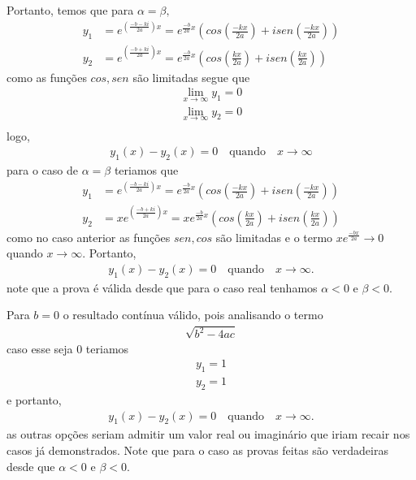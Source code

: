 \documentclass[a4paper,12pt]{article}
\begin{document}
Portanto, temos que para $\alpha = \beta,$
\begin{align*}
	y_1 &= e^{(\frac{-b - ki}{2a})x} =  {e^{\frac{-b}{2a}x}}(cos(\frac{-kx}{2a}) + isen(\frac{-kx}{2a})) \\
	y_2 &= e^{(\frac{-b + ki}{2a})x} =  {e^{\frac{-b}{2a}x}}(cos(\frac{kx}{2a}) + isen(\frac{kx}{2a}))
\end{align*}
como as fun\c c\~oes $cos, sen$ s\~ao limitadas segue que 
\begin{align*}
	\lim_{x \rightarrow \infty} y_1 = 0 \\
	\lim_{x \rightarrow \infty} y_2 = 0 \\
\end{align*}
logo, 
\begin{align*}
	y_1(x) - y_2 (x) = 0  \quad \textrm{quando} \quad x \rightarrow \infty
\end{align*}
para o caso de $\alpha = \beta$ teriamos que 
\begin{align*}
	y_1 &= e^{(\frac{-b - ki}{2a})x} =  {e^{\frac{-b}{2a}x}}(cos(\frac{-kx}{2a}) + isen(\frac{-kx}{2a})) \\
	y_2 &= xe^{(\frac{-b + ki}{2a})x} =  x{e^{\frac{-b}{2a}x}}(cos(\frac{kx}{2a}) + isen(\frac{kx}{2a}))
\end{align*}
como no caso anterior as fun\c c\~oes $sen, cos$ s\~ao limitadas e o termo $xe^{\frac{-bx}{2a}} \rightarrow 0$ quando $x
\rightarrow \infty$. Portanto,
\begin{align*}
	y_1(x) - y_2 (x) = 0  \quad \textrm{quando} \quad x \rightarrow \infty.
\end{align*}
note que a prova \'e v\'alida desde que para o caso real tenhamos $\alpha < 0$ e $\beta < 0$.

Para $b = 0$ o resultado cont\'inua v\'alido, pois analisando o termo 
\begin{align*}
	\sqrt{b^{2} - 4ac}
\end{align*}
caso esse seja 0 teriamos 
\begin{align*}
	y_1 = 1 \\
	y_2 = 1 
\end{align*}
e portanto,
\begin{align*}
	y_1(x) - y_2 (x) = 0  \quad \textrm{quando} \quad x \rightarrow \infty.
\end{align*}
as outras op\c c\~oes seriam admitir um valor real ou imagin\'ario que iriam recair nos casos j\'a demonstrados. Note
que para o caso as provas feitas s\~ao verdadeiras desde que $\alpha < 0$  e $\beta < 0$.
\end{document}
